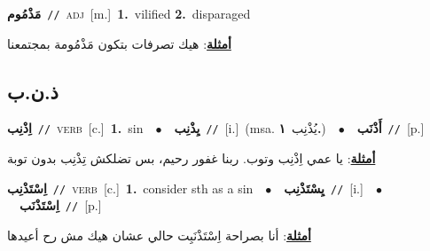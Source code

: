 \documentclass[10pt,a4paper,twoside]{article} %
\begin{document}
\begin{multicols}{2}
{{{{{{{{\setlength\topsep{0pt}\textbf{\foreignlanguage{arabic}{مَذْمُوم}}\ {\color{gray}\texttt{//}\color{black}}\ \textsc{adj}\ [m.]\ \textbf{1.}~vilified  \textbf{2.}~disparaged\  \begin{flushright}\color{gray}\foreignlanguage{arabic}{\textbf{\underline{\foreignlanguage{arabic}{أمثلة}}}: هيك تصرفات بتكون مَذْمُومة بمجتمعنا}\end{flushright}\color{black}} \vspace{2mm}

\vspace{-3mm}
\subsection*{\color{blue}\foreignlanguage{arabic}{ذ.ن.ب}\color{blue}{}} 

{\setlength\topsep{0pt}\textbf{\foreignlanguage{arabic}{اِذْنِب}}\ {\color{gray}\texttt{//}\color{black}}\ \textsc{verb}\ [c.]\ \textbf{1.}~sin\ \ $\bullet$\ \ \setlength\topsep{0pt}\textbf{\foreignlanguage{arabic}{يِذْنِب}}\ {\color{gray}\texttt{//}\color{black}}\ [i.]\ \color{gray}(msa. \foreignlanguage{arabic}{يُذْنِب}~\foreignlanguage{arabic}{\textbf{١.}})\color{black}\ \ $\bullet$\ \ \setlength\topsep{0pt}\textbf{\foreignlanguage{arabic}{أَذْنَب}}\ {\color{gray}\texttt{//}\color{black}}\ [p.]\  \begin{flushright}\color{gray}\foreignlanguage{arabic}{\textbf{\underline{\foreignlanguage{arabic}{أمثلة}}}: يا عمي اِذْنِب وتوب. ربنا غفور رحيم، بس تضلكش تِذْنِب بدون توبة}\end{flushright}\color{black}} \vspace{2mm}

{\setlength\topsep{0pt}\textbf{\foreignlanguage{arabic}{اِسْتَذْنِب}}\ {\color{gray}\texttt{//}\color{black}}\ \textsc{verb}\ [c.]\ \textbf{1.}~consider sth as a sin\ \ $\bullet$\ \ \setlength\topsep{0pt}\textbf{\foreignlanguage{arabic}{يِسْتَذْنِب}}\ {\color{gray}\texttt{//}\color{black}}\ [i.]\ \ $\bullet$\ \ \setlength\topsep{0pt}\textbf{\foreignlanguage{arabic}{اِسْتَذْنَب}}\ {\color{gray}\texttt{//}\color{black}}\ [p.]\  \begin{flushright}\color{gray}\foreignlanguage{arabic}{\textbf{\underline{\foreignlanguage{arabic}{أمثلة}}}: أنا بصراحة اِسْتَذْنَبِت حالي عشان هيك مش رح أعيدها}\end{flushright}\color{black}} \vspace{2mm}

}}}}}}}
\end{multicols}
\end{document}
